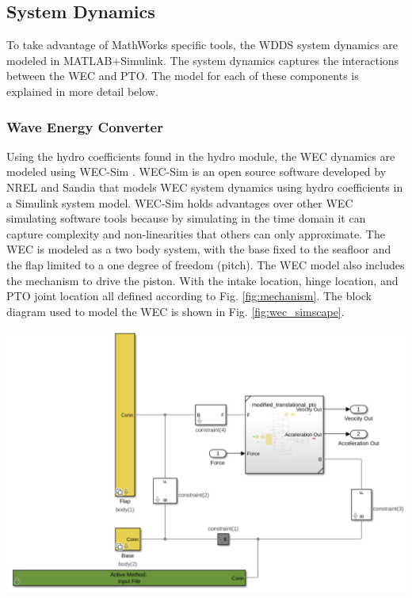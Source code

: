 \documentclass[twocolumn,10pt]{asme2e}
\begin{document}
\subsection{System Dynamics}

To take advantage of MathWorks specific tools, the WDDS system dynamics are modeled in MATLAB+Simulink. The system dynamics captures the interactions between the WEC and PTO. The model for each of these components is explained in more detail below. 

\subsubsection{Wave Energy Converter}

Using the hydro coefficients found in the hydro module, the WEC dynamics are modeled using WEC-Sim \cite{wecsim}. WEC-Sim is an open source software developed by NREL and Sandia that models WEC system dynamics using hydro coefficients in a Simulink system model. WEC-Sim holds advantages over other WEC simulating software tools because by simulating in the time domain it can capture complexity and non-linearities that others can only approximate. The WEC is modeled as a two body system, with the base fixed to the seafloor and the flap limited to a one degree of freedom (pitch). The WEC model also includes the mechanism to drive the piston. With the intake location, hinge location, and PTO joint location all defined according to Fig. \ref{fig:mechanism}. The block diagram used to model the WEC is shown in Fig. \ref{fig:wec_simscape}.
\begin{center}
    \includegraphics[width=\linewidth]{../figs/wecsimscape.pdf}
    \label{fig:wec_simscape}
\end{center}
\end{document}
